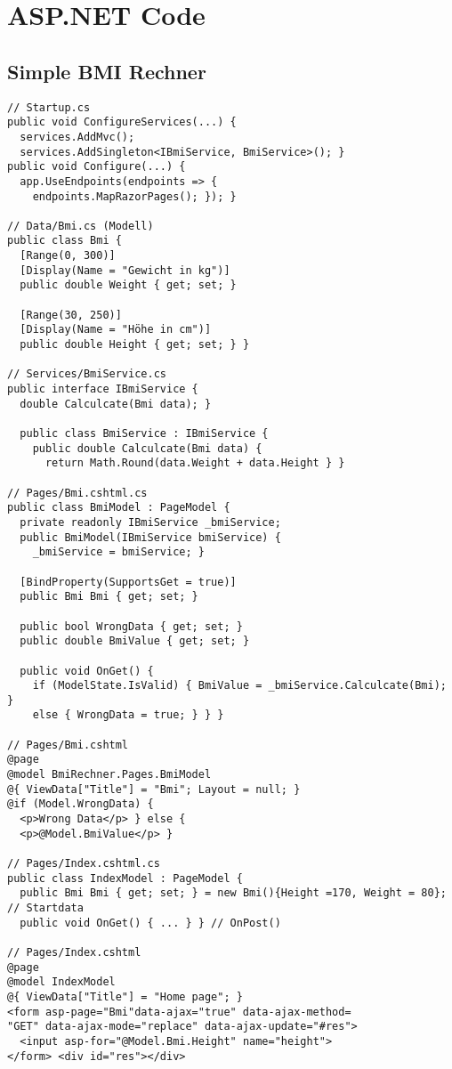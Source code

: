 \section{ASP.NET Code}
\subsection{Simple BMI Rechner}
\begin{lstlisting}[style=csh]
// Startup.cs
public void ConfigureServices(...) {
  services.AddMvc();
  services.AddSingleton<IBmiService, BmiService>(); }
public void Configure(...) {
  app.UseEndpoints(endpoints => {
    endpoints.MapRazorPages(); }); }

// Data/Bmi.cs (Modell)
public class Bmi {
  [Range(0, 300)]
  [Display(Name = "Gewicht in kg")]
  public double Weight { get; set; }

  [Range(30, 250)]
  [Display(Name = "Höhe in cm")]
  public double Height { get; set; } }

// Services/BmiService.cs
public interface IBmiService {
  double Calculcate(Bmi data); }

  public class BmiService : IBmiService {
    public double Calculcate(Bmi data) {
      return Math.Round(data.Weight + data.Height } }

// Pages/Bmi.cshtml.cs
public class BmiModel : PageModel {
  private readonly IBmiService _bmiService;
  public BmiModel(IBmiService bmiService) {
    _bmiService = bmiService; }

  [BindProperty(SupportsGet = true)]
  public Bmi Bmi { get; set; }

  public bool WrongData { get; set; }
  public double BmiValue { get; set; }

  public void OnGet() {
    if (ModelState.IsValid) { BmiValue = _bmiService.Calculcate(Bmi); }
    else { WrongData = true; } } }

// Pages/Bmi.cshtml
@page
@model BmiRechner.Pages.BmiModel
@{ ViewData["Title"] = "Bmi"; Layout = null; }
@if (Model.WrongData) {
  <p>Wrong Data</p> } else {
  <p>@Model.BmiValue</p> }

// Pages/Index.cshtml.cs
public class IndexModel : PageModel {
  public Bmi Bmi { get; set; } = new Bmi(){Height =170, Weight = 80}; // Startdata
  public void OnGet() { ... } } // OnPost()

// Pages/Index.cshtml
@page
@model IndexModel
@{ ViewData["Title"] = "Home page"; }
<form asp-page="Bmi"data-ajax="true" data-ajax-method=
"GET" data-ajax-mode="replace" data-ajax-update="#res">
  <input asp-for="@Model.Bmi.Height" name="height">
</form> <div id="res"></div>
\end{lstlisting}
